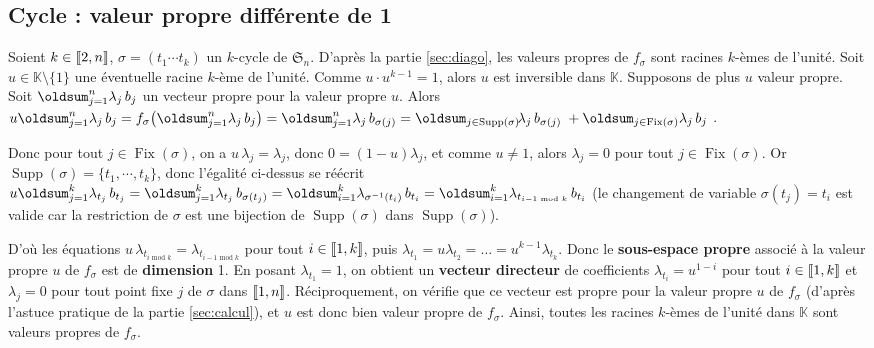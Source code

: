 \documentclass[10pt,a4paper,french,landscape]{article}
\DeclarePairedDelimiter\parenlong{\lparen}{\rparen}
\newcommand{\paren}[1]{\parenlong*{#1}}
\DeclarePairedDelimiter\bracketlong{\llbracket}{\rrbracket}
\newcommand{\br}[1]{\bracketlong*{#1}}
\renewcommand{\sum}{\displaystyle\oldsum}
\theoremstyle{definition}
\theoremstyle{remark}
\DeclareMathOperator{\Fix}{Fix}
\DeclareMathOperator{\Supp}{Supp}
\DeclareMathOperator{\car}{car}
\newcommand{\KK}{\mathbb K}
\newcommand{\Sy}{\mathfrak{S}}
\newcommand{\1}{\mathbbm{1}}
\newcommand{\Sn}[1][n]{\Sy_{#1}}
\begin{document}
\begin{multicols*}{2}
\section{Cycle : valeur propre différente de 1}
\label{sec:cycle-non-1}

Soient $k\in\br{2,n}$, $\sigma=(t_1 \cdots t_k)$ un $k$-cycle de $\Sn$. D'après la partie \ref{sec:diago}, les valeurs propres de $f_\sigma$ sont racines $k$-èmes de l'unité. Soit $u\in\KK\setminus\{1\}$ une éventuelle racine $k$-ème de l'unité. Comme $u\cdot u^{k-1}=1$, alors $u$ est inversible dans $\KK$.
Supposons de plus $u$ valeur propre. Soit $\sum_{j=1}^n \lambda_{j}\, b_{j}$ un vecteur propre pour la valeur propre $u$. Alors
$
u\sum_{j=1}^n \lambda_{j}\, b_{j}
=f_\sigma\paren{\sum_{j=1}^n \lambda_{j}\, b_{j}}
=\sum_{j=1}^n \lambda_{j}\, b_{\sigma(j)}
=\sum_{j\in\Supp(\sigma)}\!\lambda_{j}\, b_{\sigma(j)}\;+\sum_{j\in\Fix(\sigma)} \lambda_{j}\, b_{j}$ .
\medskip

\noindent
Donc pour tout $j\in\Fix(\sigma)$, on a $u\,\lambda_{j}=\lambda_{j}$,
%
donc $0=(1-u)\lambda_{j}$, et comme $u\neq 1$, alors $\lambda_{j}=0$ pour tout $j\in\Fix(\sigma)$.
Or $\Supp(\sigma)=\{t_1, \cdots, t_k\}$, donc l'égalité ci-dessus se réécrit
$
u\sum_{j=1}^k \lambda_{t_j}\, b_{t_j}
=\sum_{j=1}^k \lambda_{t_j}\, b_{\sigma(t_j)}
=\sum_{i=1}^k \lambda_{\sigma^{-1}(t_i)}\, b_{t_i}
=\sum_{i=1}^k \lambda_{t_{i-1\text{ mod }k}}\, b_{t_{i}}
$ (le changement de variable $\sigma(t_j)=t_i$ est valide car la restriction de $\sigma$ est une bijection de $\Supp(\sigma)$ dans $\Supp(\sigma)$).\medskip

D'où les équations
$u\,\lambda_{t_{i\text{ mod }k}}=\lambda_{t_{i-1\text{ mod }k}}$ pour tout $i\in\br{1,k}$, puis
${\lambda_{t_1}=u\lambda_{t_{2}}=\ldots=u^{k-1}\lambda_{t_k}}$. Donc le \textbf{sous-espace propre} associé à la valeur propre $u$ de $f_\sigma$ est de \textbf{dimension} 1.
En posant $\lambda_{t_1}=1$, on obtient un \textbf{vecteur directeur} de coefficients $\lambda_{t_{i}}=u^{1-i}$ pour tout $i\in\br{1,k}$ et $\lambda_j=0$ pour tout point fixe $j$ de $\sigma$ dans $\br{1,n}$. Réciproquement, on vérifie que ce vecteur est propre pour la valeur propre $u$ de $f_\sigma$ (d'après l'astuce pratique de la partie \ref{sec:calcul}), et $u$ est donc bien valeur propre de $f_\sigma$. Ainsi, toutes les racines $k$-èmes de l'unité dans $\KK$ sont valeurs propres de $f_\sigma$.
\medskip


\end{multicols*}
\end{document}
